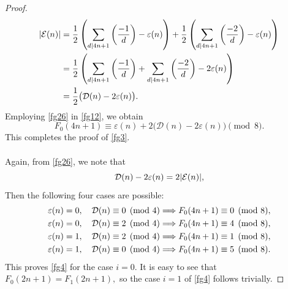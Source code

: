 \documentclass[10pt,a4paper]{amsart}
\begin{document}
\begin{proof}
\begin{align}
|\mathcal{E}(n)|
&=
\dfrac{1}{2}
\left(
\sum_{d\mid 4n+1}\left(\dfrac{-1}{d}\right)
-
\varepsilon(n)
\right)
+
\dfrac{1}{2}
\left(
\sum_{d\mid 4n+1}\left(\dfrac{-2}{d}\right)
-
\varepsilon(n)
\right) \notag\\
&=
\dfrac{1}{2}
\left(
\sum_{d\mid 4n+1}\left(\dfrac{-1}{d}\right)
+
\sum_{d\mid 4n+1}\left(\dfrac{-2}{d}\right)
-
2\varepsilon(n)
\right) \notag\\
&=
\dfrac{1}{2}\bigl(\mathcal{D}(n)-2\varepsilon(n)\bigr).
\label{fg26}
\end{align}
Employing \eqref{fg26} in \eqref{fg12}, we obtain
\begin{equation}
F_0(4n+1)
\equiv
\varepsilon(n)+2\bigl(\mathcal{D}(n)-2\varepsilon(n)\bigr)
\pmod 8.
\end{equation}
This completes the proof of \eqref{fg3}. \\\\
Again,  from \eqref{fg26}, we note that
\begin{equation}
\mathcal{D}(n)-2\varepsilon(n)=2|\mathcal{E}(n)|,\notag
\end{equation}
Then the following four cases are possible:
\begin{align}
\varepsilon(n)=0,\quad \mathcal{D}(n)\equiv0\pmod4
&\Longrightarrow
F_0(4n+1)\equiv0\pmod8,\notag\\
\varepsilon(n)=0,\quad \mathcal{D}(n)\equiv2\pmod4
&\Longrightarrow
F_0(4n+1)\equiv4\pmod8,\notag\\
\varepsilon(n)=1,\quad \mathcal{D}(n)\equiv2\pmod4
&\Longrightarrow
F_0(4n+1)\equiv1\pmod8,\notag\\
\varepsilon(n)=1,\quad \mathcal{D}(n)\equiv0\pmod4
&\Longrightarrow
F_0(4n+1)\equiv5\pmod8.\notag
\end{align}
This proves \eqref{fg4} for the case $i=0$. It is easy to see that $F_0(2n+1)=F_1(2n+1),$ so the case  $i=1$ of \eqref{fg4} follows trivially.
\end{proof}
\end{document}
